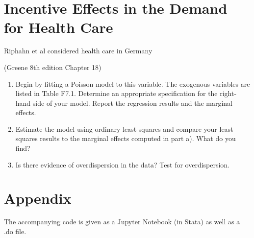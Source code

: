 \documentclass{article}
\begin{document}
\newpage
\section{Incentive Effects in the Demand for Health Care}
Riphahn et al considered health care in Germany \cite{riphahn2003incentive}

(Greene 8th edition Chapter 18)
\begin{enumerate}[label=(\alph*)]
\item Begin by fitting a Poisson model to this variable. The exogenous variables are listed in Table F7.1. Determine an appropriate specification for the right-hand side of your model. Report the regression results and the marginal effects.
\item Estimate the model using ordinary least squares and compare your least squares results to the marginal effects computed in part a). What do you find?
\item Is there evidence of overdispersion in the data? Test for overdispersion.
\end{enumerate}

\newpage

\section{Appendix}
The accompanying code is given as a Jupyter Notebook (in Stata) as well as a .do file.



\end{document}

